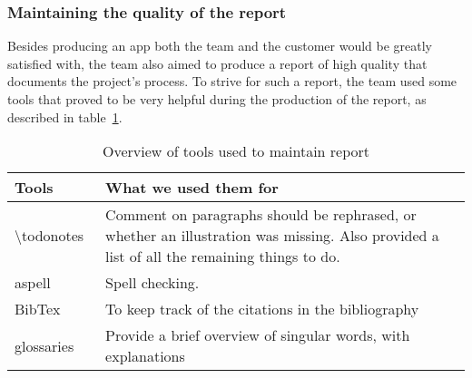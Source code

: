 \subsubsection{Maintaining the quality of the report}
Besides producing an app both the team and the customer would be greatly satisfied with, the team also aimed to produce a report of high quality that documents the project's process. To strive for such a report, the team used some tools that proved to be very helpful during the production of the report, as described in table~\ref{tab:reportTools}.

\begin{table}[H]
\begin{tabular}{|l|p{13.7cm}|}
\hline
\textbf{Tools} & \textbf{What we used them for}\\\hline
\textbackslash todonotes~\cite{todo}&Comment on paragraphs should be rephrased, or whether an illustration was missing. Also provided a list of all the remaining things to do.\\\hline
aspell~\cite{aspell} & Spell checking.\\\hline
BibTex~\cite{bibtex}&To keep track of the citations in the bibliography\\\hline
glossaries~\cite{glossaries}& Provide a brief overview of singular words, with explanations\\\hline
\end{tabular}
\caption{Overview of tools used to maintain report}
\label{tab:reportTools}
\end{table}

\begin{comment}
\subsubsection{\textbackslash todonotes}
Feedback is key when creating a product. The \textbackslash todonotes~\cite{todo} package allowed the team to comment on paragraphs and formulations we wanted to rephrase, whether an illustration was missing, and also gave us a list of all the things we had to do, making it easy to get an overview of the remaining tasks regarding the report.\\

\subsubsection{Spell checking: aspell}
Although manual proofreading cannot be avoided, it is advantageous to have a tool to perform automatic spell checking. Aspell~\cite{aspell} is such a tool.\\

\subsubsection{References and glossary}
To keep track of the citations in the bibliography in the report, we used a LaTeX-package called BibTex~\cite{bibtex}, and for our glossaries, a package called glossaries~\cite{glossaries}.

\end{comment}
